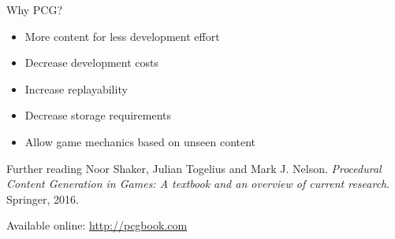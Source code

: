 
\begin{frame}{Why PCG?}
	\begin{itemize}
		\pause\item More content for less development effort
		\pause\item Decrease development costs
		\pause\item Increase replayability
		\pause\item Decrease storage requirements
		\pause\item Allow game mechanics based on unseen content
	\end{itemize}
\end{frame}

\begin{frame}{Further reading}
	Noor Shaker, Julian Togelius and Mark J. Nelson.
	\textit{Procedural Content Generation in Games: A textbook and an overview of current research}.
	Springer, 2016.
	
	Available online: \url{http://pcgbook.com}
\end{frame}
